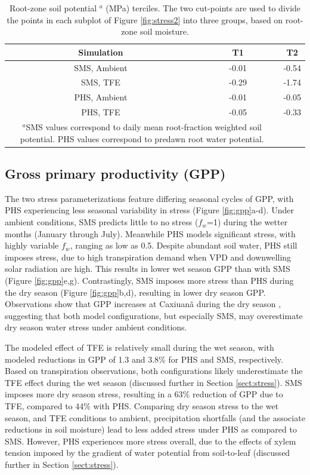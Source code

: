 \documentclass[draft,linenumbers]{agujournal}
\begin{document}
\begin{table}
\caption{Root-zone soil potential $^a$ (MPa) terciles. The two cut-points are used to divide the points in each subplot of Figure \ref{fig:stress2} into three groups, based on root-zone soil moisture.}
\label{tab:tercile}
\centering
\begin{tabular}{c c c }
Simulation & T1 & T2 \\
\hline
SMS, Ambient & -0.01 & -0.54 \\
SMS, TFE & -0.29 & -1.74 \\
PHS, Ambient & -0.01 & -0.05 \\
PHS, TFE & -0.05 & -0.33 \\
\hline
\multicolumn{2}{p{.8\linewidth}}{$^{a}$SMS values correspond to daily mean root-fraction weighted soil potential.
PHS values correspond to predawn root water potential.}
\end{tabular}
\end{table}


\subsection{Gross primary productivity (GPP)}

The two stress parameterizations feature differing seasonal cycles of GPP, with PHS experiencing less seasonal variability in stress (Figure \ref{fig:gpp}a-d).
Under ambient conditions, SMS predicts little to no stress ($f_w$=1) during the wetter months (January through July).
Meanwhile PHS models significant stress, with highly variable $f_w$, ranging as low as 0.5.
Despite abundant soil water, PHS still imposes stress, due to high transpiration demand when VPD and downwelling solar radiation are high.
This results in lower wet season GPP  than with SMS (Figure \ref{fig:gpp}e,g).
Contrastingly, SMS imposes more stress than PHS during the dry season (Figure \ref{fig:gpp}b,d), 
resulting in lower dry season GPP.
Observations show that GPP increases at Caxiuan\~a during the dry season \citep{restrepo2017}, suggesting that both model configurations, 
but especially SMS, may overestimate dry season water stress under ambient conditions.  

The modeled effect of TFE is relatively small during the wet season, with modeled reductions in GPP of 1.3 and 3.8\% for PHS and SMS, respectively.
Based on transpiration observations, both configurations likely underestimate the TFE effect during the wet season (discussed further in Section \ref{sect:stress}).
SMS imposes more dry season stress, resulting in a 63\% reduction of GPP due to TFE, compared to 44\% with PHS.
Comparing dry season stress to the wet season, and TFE conditions to ambient, precipitation shortfalls (and the associate reductions in soil moisture) lead to less added stress under PHS as compared to SMS.
However, PHS experiences more stress overall, due to the effects of xylem tension imposed by the gradient of water potential from soil-to-leaf (discussed further in Section \ref{sect:stress}).
\end{document}
